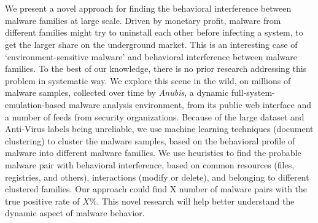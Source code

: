 \chapter{\abstractname}
We present a novel approach for finding the behavioral interference between malware families at large scale.
Driven by monetary profit, malware from different families might try to uninstall each other before infecting a system, to get the larger share on the underground market.
This is an interesting case of `environment-sensitive malware' and behavioral interference between malware families.
To the best of our knowledge, there is no prior research addressing this problem in systematic way.
We explore this scene in the wild, on millions of malware samples, collected over time by \emph{Anubis}, a dynamic full-system-emulation-based malware analysis environment, from its public web interface and a number of feeds from security organizations.
Because of the large dataset and Anti-Virus labels being unreliable, we use machine learning techniques (document clustering) to cluster the malware samples, based on the behavioral profile of malware into different malware families.
We use heuristics to find the probable malware pair with behavioral interference, based on common resources (files, registries, and others), interactions (modify or delete), and belonging to different clustered families.
Our approach could find X number of malware pairs with the true positive rate of $X\%$.
This novel research will help better understand the dynamic aspect of malware behavior.
